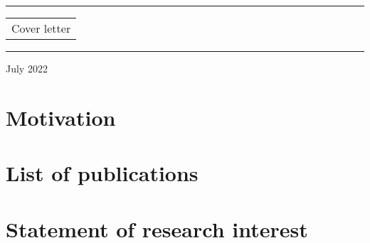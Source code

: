 \documentclass{cvf}
\begin{document}
\thispagestyle{empty}
\begin{center}

    \vspace{5cm}
    \par\noindent\rule[1ex]{\textwidth}{1.5pt}
    {\Huge \begin{tabular}{c}
            Cover letter
        \end{tabular} }
    \par\noindent\rule{\textwidth}{1.5pt}
    \vspace{2cm}
    \par{}
    \vfill
    July 2022
\end{center}



\setcounter{tocdepth}{1}
\tableofcontents

\chapter{Motivation}




\chapter{List of publications}


\chapter{Statement of research interest}

\end{document}
